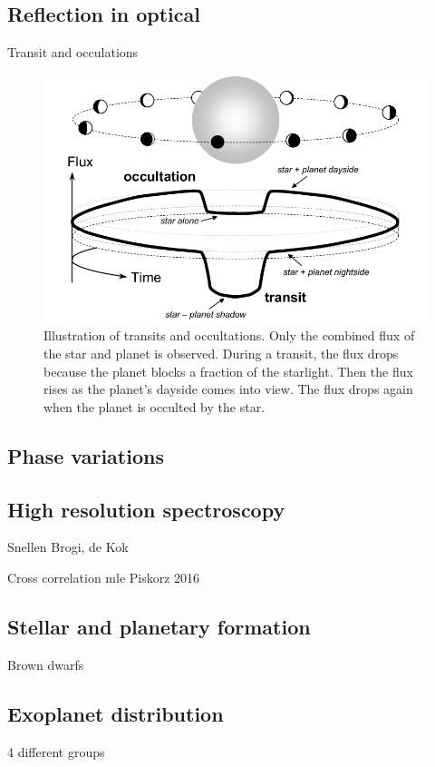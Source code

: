 \subsection{Reflection in optical}

Transit and occulations \citet{winn_transits_2010}


\begin{figure}
    \centering
    \includegraphics[width=0.6\linewidth]{./figures/introduction/circular_diagram.png}
    \caption{Illustration of transits and occultations. Only the combined flux of the star and planet is observed. During a transit, the flux
        drops because the planet blocks a fraction of the starlight. Then the flux rises as the planet’s dayside comes into view. The flux drops
        again when the planet is occulted by the star. \citet{winn_transits_2010}}
    \label{fig:transits_and_occultations}
\end{figure}

\subsection{Phase variations}

\subsection{High resolution spectroscopy}
Snellen  Brogi, de Kok

Cross correlation mle  Piskorz 2016


\subsection{Stellar and planetary formation}

Brown dwarfs

\subsection{Exoplanet distribution} 4 different groups

